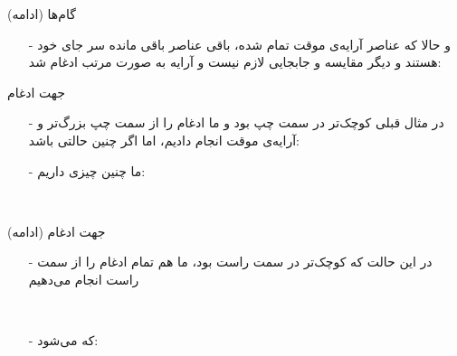 \begin{frame}{گام‌ها (ادامه)}
\begin{itemize}\itemr
\item[-]
و حالا که عناصر آرایه‌ی موقت تمام شده، باقی عناصر باقی مانده سر جای خود هستند و دیگر مقایسه و جابجایی لازم نیست و آرایه به صورت مرتب ادغام شد:

\begin{lfl}
\end{lfl}
\end{itemize}
\end{frame}

\begin{frame}{جهت ادغام}
\begin{itemize}\itemr
\item[-]
در مثال قبلی  کوچک‌تر در سمت چپ بود و ما ادغام را از سمت چپ  بزرگ‌تر و آرایه‌ی موقت انجام دادیم، اما اگر چنین حالتی باشد:
\begin{lfl}
\end{lfl}

\item[-]
ما چنین چیزی داریم:
\begin{lfl}
\\
\end{lfl}
\end{itemize}
\end{frame}

\begin{frame}{جهت ادغام (ادامه)}
\begin{itemize}\itemr
\item[-]
در این حالت که 
کوچک‌تر در سمت راست بود، ما هم تمام ادغام را از سمت راست انجام می‌دهیم

\begin{lfl}
\\
\end{lfl}

\item[-]
که می‌شود:
\begin{lfl}
\\
\end{lfl}
\end{itemize}
\end{frame}

